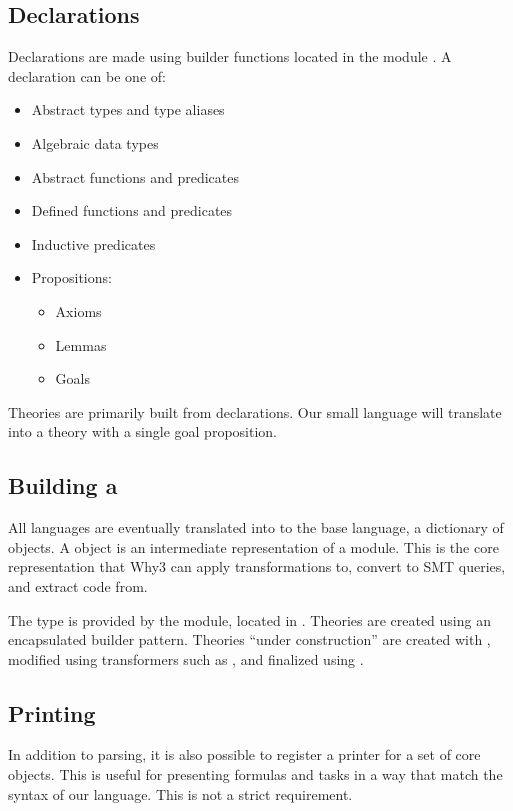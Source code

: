 \subsection{Declarations}

Declarations are made using builder functions located in the module .
A declaration can be one of:

\begin{itemize}
    \item Abstract types and type aliases
    \item Algebraic data types
    \item Abstract functions and predicates
    \item Defined functions and predicates
    \item Inductive predicates
    \item Propositions:
    \begin{itemize}
        \item Axioms
        \item Lemmas
        \item Goals
    \end{itemize}
\end{itemize}

Theories are primarily built from declarations.
Our small language will translate into a theory with a single goal proposition.

\subsection{Building a }

All languages are eventually translated into to the base language,
a dictionary of  objects.
A  object is an intermediate representation of a module.
This is the core representation that Why3 can apply transformations to,
convert to SMT queries, and extract code from.

The  type is provided by the  module,
located in .
Theories are created using an encapsulated builder pattern.
Theories ``under construction'' are  created with ,
modified using transformers such as ,
and finalized using .

\subsection{Printing}

In addition to parsing,
it is also possible to register a printer for a set of core objects.
This is useful for presenting formulas and tasks in a way that match the syntax of our language.
This is not a strict requirement.
